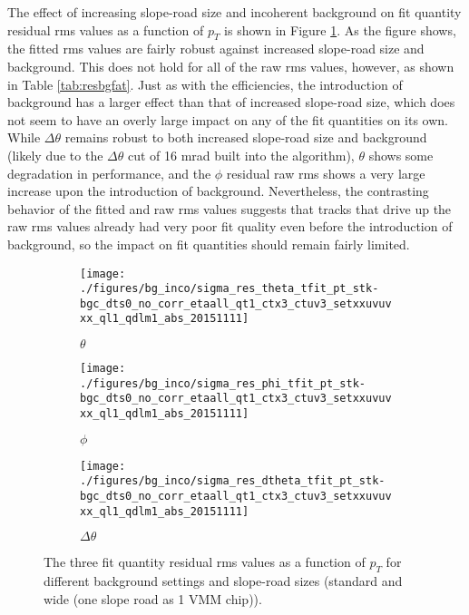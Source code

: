 The effect of increasing slope-road size and incoherent background on fit quantity residual rms values as a function of $p_T$ is shown in Figure \ref{fig:statbg}.  As the figure shows, the fitted rms values are fairly robust against increased slope-road size and background.  This does not hold for all of the raw rms values, however, as shown in Table \ref{tab:resbgfat}.  Just as with the efficiencies, the introduction of background has a larger effect than that of increased slope-road size, which does not seem to have an overly large impact on any of the fit quantities on its own.  While $\Delta\theta$ remains robust to both increased slope-road size and background (likely due to the $\Delta\theta$ cut of 16 mrad built into the algorithm),  $\theta$ shows some degradation in performance, and the $\phi$ residual raw rms shows a very large increase upon the introduction of background.  Nevertheless, the contrasting behavior of the fitted and raw rms values suggests that tracks that drive up the raw rms values already had very poor fit quality even before the introduction of background, so the impact on fit quantities should remain fairly limited.
\begin{figure}[!htbp]\captionsetup{justification=centering}\captionsetup{justification=centering}
  \begin{center}
\begin{subfigure}[t]{0.320\textwidth\textwidth}\centering\texttt{[image: ./figures/bg\_inco/sigma\_res\_theta\_tfit\_pt\_stk-bgc\_dts0\_no\_corr\_etaall\_qt1\_ctx3\_ctuv3\_setxxuvuvxx\_ql1\_qdlm1\_abs\_20151111]}\caption{$\theta$}\end{subfigure}
\begin{subfigure}[t]{0.320\textwidth\textwidth}\centering\texttt{[image: ./figures/bg\_inco/sigma\_res\_phi\_tfit\_pt\_stk-bgc\_dts0\_no\_corr\_etaall\_qt1\_ctx3\_ctuv3\_setxxuvuvxx\_ql1\_qdlm1\_abs\_20151111]}\caption{$\phi$}\end{subfigure}
\begin{subfigure}[t]{0.320\textwidth\textwidth}\centering\texttt{[image: ./figures/bg\_inco/sigma\_res\_dtheta\_tfit\_pt\_stk-bgc\_dts0\_no\_corr\_etaall\_qt1\_ctx3\_ctuv3\_setxxuvuvxx\_ql1\_qdlm1\_abs\_20151111]}\caption{$\Delta\theta$}\end{subfigure}
  \caption{\label{fig:statbg} The three fit quantity residual rms values as a function of $p_T$ for different background settings and slope-road sizes (standard and wide (one slope road as 1 VMM chip)).}
  \end{center}
\end{figure}

